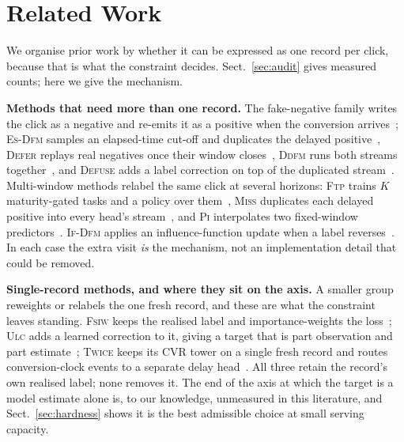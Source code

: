 \documentclass[runningheads]{llncs}
\begin{document}
\section{Related Work}\label{sec:related}

We organise prior work by whether it can be expressed as one record per click, because that is what
the constraint decides. Sect.~\ref{sec:audit} gives measured counts; here we give the mechanism.

\smallskip\noindent\textbf{Methods that need more than one record.} The fake-negative family writes
the click as a negative and re-emits it as a positive when the conversion
arrives~\cite{ktena2019addressing}; \textsc{Es-Dfm} samples an elapsed-time cut-off and duplicates
the delayed positive~\cite{yang2021capturing}, \textsc{Defer} replays real negatives once their
window closes~\cite{gu2021real}, \textsc{Ddfm} runs both streams together~\cite{dai2023dually}, and
\textsc{Defuse} adds a label correction on top of the duplicated
stream~\cite{chen2022asymptotically}. Multi-window methods relabel the same click at several
horizons: \textsc{Ftp} trains $K$ maturity-gated tasks and a policy over
them~\cite{li2021follow}, \textsc{Miss} duplicates each delayed positive into every head's
stream~\cite{liu2024online}, and \textsc{Pi} interpolates two fixed-window
predictors~\cite{zhang2025personalized}. \textsc{If-Dfm} applies an influence-function update when
a label reverses~\cite{ding2026delayed}. In each case the extra visit \emph{is} the mechanism, not
an implementation detail that could be removed.

\smallskip\noindent\textbf{Single-record methods, and where they sit on the axis.} A smaller group
reweights or relabels the one fresh record, and these are what the constraint leaves standing.
\textsc{Fsiw} keeps the realised label and importance-weights the loss~\cite{yasui2020feedback};
\textsc{Ulc} adds a learned correction to it, giving a target that is part observation and part
estimate~\cite{wang2023unbiased}; \textsc{Twice} keeps its CVR tower on a single fresh record and
routes conversion-clock events to a separate delay head~\cite{li2026twice}. All three retain the
record's own realised label; none removes it. The end of the axis at which the target is a model
estimate alone is, to our knowledge, unmeasured in this literature, and Sect.~\ref{sec:hardness}
shows it is the best admissible choice at small serving capacity.
\end{document}
